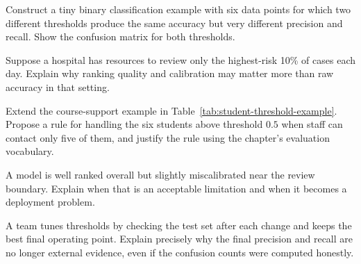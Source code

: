 \begin{challengeexercises}
\item Construct a tiny binary classification example with six data points for which two different thresholds produce the same accuracy but very different precision and recall. Show the confusion matrix for both thresholds.
\item Suppose a hospital has resources to review only the highest-risk 10\% of cases each day. Explain why ranking quality and calibration may matter more than raw accuracy in that setting.
\item Extend the course-support example in Table~\ref{tab:student-threshold-example}. Propose a rule for handling the six students above threshold $0.5$ when staff can contact only five of them, and justify the rule using the chapter's evaluation vocabulary.
\item A model is well ranked overall but slightly miscalibrated near the review boundary. Explain when that is an acceptable limitation and when it becomes a deployment problem.
\item A team tunes thresholds by checking the test set after each change and keeps the best final operating point. Explain precisely why the final precision and recall are no longer external evidence, even if the confusion counts were computed honestly.
\end{challengeexercises}
